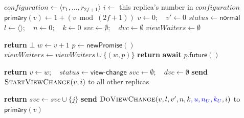 \begin{algorithm}[!tb]
  \caption{Viewstamped Replication: Starting a View Change}
  \label{vr-start-view-change}
  \begin{algorithmic}[1]
    \State $\mathit{configuration}\gets\langle r_1,\ldots,r_{2f+1}\rangle$
    \State $i\gets$ this replica's number in $\mathit{configuration}$
    \State $\mathsf{primary}(v)\gets 1+(v\bmod(2f+1))$
    \State $v\gets 0;\quad v'\gets 0$
    \State $\mathit{status}\gets\mathsf{normal}$
    \State $l\gets\langle\rangle;\quad n\gets 0;\quad k\gets 0$
    \State {}
    \State {}
    \State $\mathit{svc}\gets\emptyset;\quad\mathit{dvc}\gets\emptyset$
    \State $\mathit{viewWaiters}\gets\emptyset$

        \State \textbf{return} $\bot$
      \EndIf
      \State $w\gets v+1$
      \State $p\gets\mathsf{newPromise}()$
      \State $\mathit{viewWaiters}\gets\mathit{viewWaiters}\cup\{(w,p)\}$
      \State {}
      \State \textbf{return} \textbf{await} $p.\mathsf{future}()$
    \EndProcedure

        \State \textbf{return}
      \EndIf
      \State $v\gets w;\quad\mathit{status}\gets\mathsf{view\mbox{-}change}$
      \State $\mathit{svc}\gets\emptyset;\quad\mathit{dvc}\gets\emptyset$
      \State \textbf{send} $\textsc{StartViewChange}(v,i)$ to all other replicas
    \EndProcedure

        \State \textbf{return}
      \EndIf
        \State {}
      \EndIf
       
        \State $\mathit{svc}\gets\mathit{svc}\cup\{j\}$
          \State \textbf{send}
            $\textsc{DoViewChange}(v,l,v',n,k\textcolor{blue}{,u,n_U,k_U},i)$
            to $\mathsf{primary}(v)$
        \EndIf
      \EndIf
    \EndProcedure
  \end{algorithmic}
\end{algorithm}


